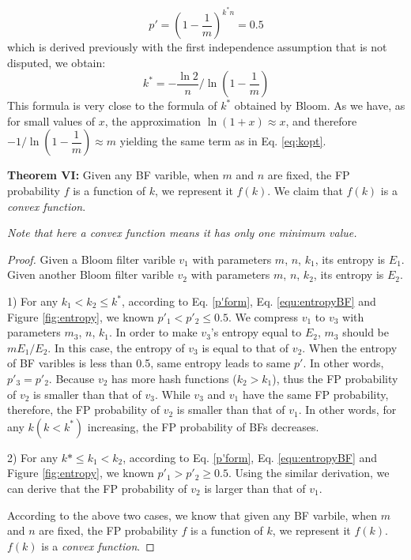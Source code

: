 \begin{equation}
p'=\left(1-\frac{1}{m}\right)^{k^* n}=0.5
\label{equ:p=0.5}
\end{equation}
which is derived previously with the first independence assumption that is not disputed, we obtain:
\begin{equation}
\label{equ:mykform}
k^*=-\dfrac{\ln 2}{n} / \ln\left(1-\dfrac{1}{m}\right)
\end{equation}
This formula is very close to the formula of $k^*$ obtained by Bloom. As we have, as for small values of $x$, the approximation $\ln(1+x)\approx x$, and therefore $-1/\ln(1-\dfrac{1}{m}) \approx m$ yielding the same term as in Eq. \ref{eq:kopt}.


\textbf{Theorem VI:} Given any BF varible, when $m$ and $n$ are fixed, the FP probability $f$ is a function of $k$, we represent it $f(k)$. We claim that $f(k)$ is a \textit{convex function}.

\textit{Note that here a convex function means it has only one minimum value.}
\begin{proof}
Given a Bloom filter varible $v_1$ with parameters $m$, $n$, $k_1$, its entropy is $E_1$.
Given another Bloom filter varible $v_2$ with parameters $m$, $n$, $k_2$, its entropy is $E_2$.

1) For any $k_1<k_2\leqslant k^*$, according to Eq. \ref{p'form}, Eq. \ref{equ:entropyBF} and Figure \ref{fig:entropy}, we known $p'_1<p'_2\leqslant 0.5$.
We compress $v_1$ to $v_3$ with parameters $m_3$, $n$, $k_1$. In order to make $v_3$'s entropy equal to $E_2$, $m_3$ should be $mE_1/E_2$. In this case, the entropy of $v_3$ is equal to that of $v_2$. When the entropy of BF varibles is less than 0.5, same entropy leads to same $p'$. In other words, $p'_3=p'_2$. Because $v_2$ has more hash functions ($k_2>k_1$), thus the FP probability of $v_2$ is smaller than that of $v_3$. While $v_3$ and $v_1$ have the same FP probability, therefore, the FP probability of $v_2$ is smaller than that of $v_1$.
In other words, for any $k (k<k^*)$ increasing, the FP probability of BFs decreases.

2) For any $k*\leqslant k_1<k_2$, according to Eq. \ref{p'form}, Eq. \ref{equ:entropyBF} and Figure \ref{fig:entropy}, we known $p'_1>p'_2\geqslant 0.5$. 
Using the similar derivation, we can derive that the FP probability of $v_2$ is larger than that of $v_1$.

According to the above two cases, we know that given any BF varbile, when $m$ and $n$ are fixed, the FP probability $f$ is a function of $k$, we represent it $f(k)$.  $f(k)$ is a \textit{convex function}.
\end{proof}

